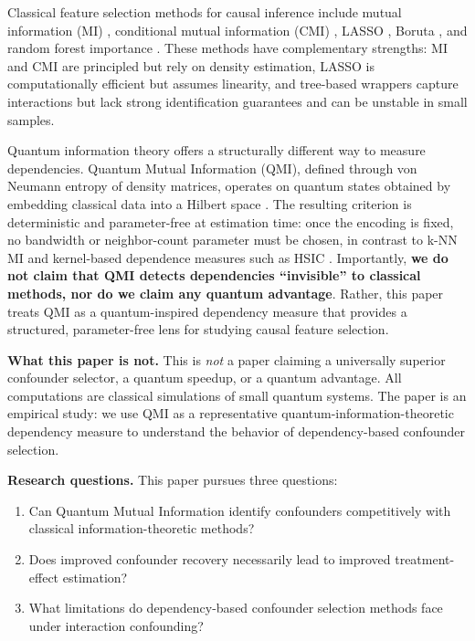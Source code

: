 \documentclass{svproc}
\begin{document}
Classical feature selection methods for causal inference include mutual information (MI) \cite{fleuret2004fast}, conditional mutual information (CMI) \cite{tsamardinos2003algorithms}, LASSO \cite{tibshirani1996regression}, Boruta \cite{kursa2010boruta}, and random forest importance \cite{breiman2001random}. These methods have complementary strengths: MI and CMI are principled but rely on density estimation, LASSO is computationally efficient but assumes linearity, and tree-based wrappers capture interactions but lack strong identification guarantees and can be unstable in small samples.

Quantum information theory offers a structurally different way to measure dependencies. Quantum Mutual Information (QMI), defined through von Neumann entropy of density matrices, operates on quantum states obtained by embedding classical data into a Hilbert space \cite{havlivcek2019supervised,schuld2021supervised}. The resulting criterion is deterministic and parameter-free at estimation time: once the encoding is fixed, no bandwidth or neighbor-count parameter must be chosen, in contrast to k-NN MI \cite{kraskov2004estimating} and kernel-based dependence measures such as HSIC \cite{gretton2005measuring,gretton2007kernel}. Importantly, \textbf{we do not claim that QMI detects dependencies ``invisible'' to classical methods, nor do we claim any quantum advantage}. Rather, this paper treats QMI as a quantum-inspired dependency measure that provides a structured, parameter-free lens for studying causal feature selection.

\textbf{What this paper is not.} This is \textit{not} a paper claiming a universally superior confounder selector, a quantum speedup, or a quantum advantage. All computations are classical simulations of small quantum systems. The paper is an empirical study: we use QMI as a representative quantum-information-theoretic dependency measure to understand the behavior of dependency-based confounder selection.

\textbf{Research questions.} This paper pursues three questions:
\begin{enumerate}
    \item[RQ1] Can Quantum Mutual Information identify confounders competitively with classical information-theoretic methods?
    \item[RQ2] Does improved confounder recovery necessarily lead to improved treatment-effect estimation?
    \item[RQ3] What limitations do dependency-based confounder selection methods face under interaction confounding?
\end{enumerate}
\end{document}
